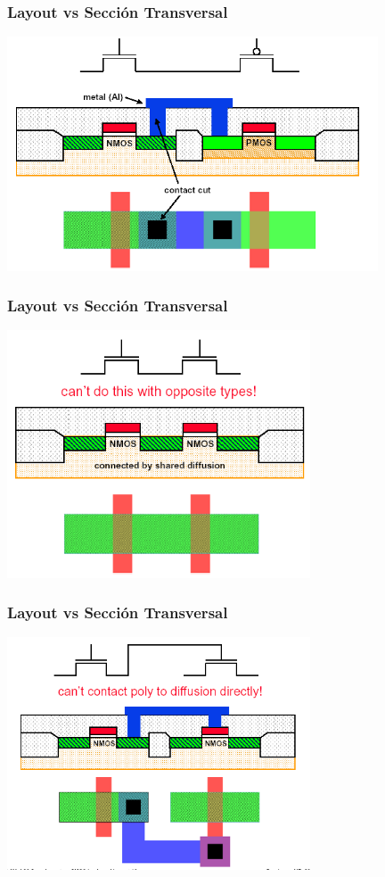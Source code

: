 \documentclass[aspectratio=169,10pt]{beamer}
\begin{document}
\begin{frame}[t]
\frametitle{Layout vs Sección Transversal}
\centering
\includegraphics[width=11cm]{CMOSb}
\end{frame}


\begin{frame}[t]
\frametitle{Layout vs Sección Transversal}
\centering
\includegraphics[width=9cm]{CMOSc}
\end{frame}


\begin{frame}[t]
\frametitle{Layout vs Sección Transversal}
\centering
\includegraphics[width=9cm]{CMOSd}
\end{frame}
\end{document}
